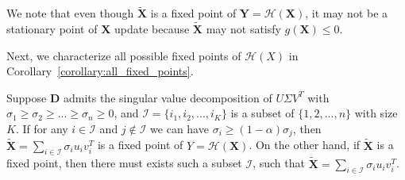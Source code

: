 We note that even though $\tilde{\mathbf{X}}$ is a fixed point of $\mathbf{Y} = \mathcal{H}(\mathbf{X})$, it may not be a stationary point of $\mathbf{X}$ update because $\tilde{\mathbf{X}}$ may not satisfy $g(\mathbf{X})\leq 0$.


Next, we characterize all possible fixed points of $\mathcal{H}(X)$ in Corollary~\ref{corollary:all_fixed_points}.

\begin{corollary}\label{corollary:all_fixed_points}
Suppose $\mathbf{D}$ admits the singular value decomposition of $U \Sigma V^T$ with $\sigma_1\geq \sigma_2\geq ...\geq \sigma_n\geq 0$, and $\mathcal{I} = \{i_1,i_2,...,i_K\}$ is a subset of $\{1,2,...,n\}$ with size $K$. If for any $i\in \mathcal{I}$ and $j\notin \mathcal{I}$ we can have $\sigma_{i}\geq (1-\alpha)\sigma_{j}$, then $\tilde{\mathbf{X}} = \sum_{i\in\mathcal{I}}\sigma_iu_iv_i^T$ is a fixed point of $Y=\mathcal{H}(\mathbf{X})$. On the other hand, if $\tilde{\mathbf{X}}$ is a fixed point, then there must exists such a subset $\mathcal{I}$, such that $\tilde{\mathbf{X}} = \sum_{i\in\mathcal{I}}\sigma_iu_iv_i^T$.
\end{corollary}

